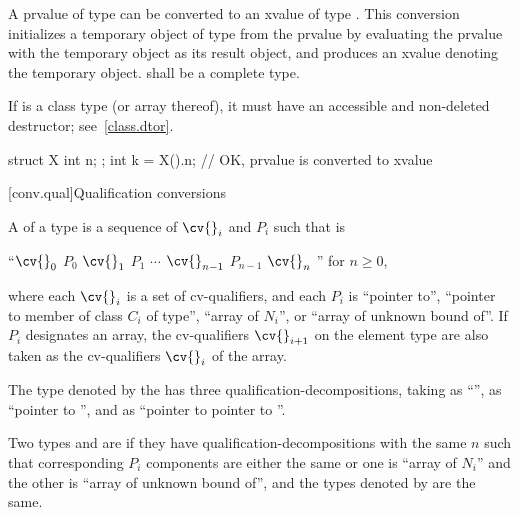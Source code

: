\pnum
A prvalue of type  can be converted to an xvalue of type .
This conversion initializes a temporary object of type  from the prvalue
by evaluating the prvalue with the temporary object as its result object,
and produces an xvalue denoting the temporary object.
 shall be a complete type.
\begin{note}
If  is a class type (or array thereof),
it must have an accessible and non-deleted destructor;
see~\ref{class.dtor}.
\end{note}
\begin{example}
\begin{codeblock}
struct X { int n; };
int k = X().n;      // OK,  prvalue is converted to xvalue
\end{codeblock}
\end{example}

[conv.qual]{Qualification conversions}

%
\pnum
A  of a type 
is a sequence of
$\cv{}_i$ and $P_i$
such that  is
\begin{indented}
``$\cv{}_0$ $P_0$ $\cv{}_1$ $P_1$ $\cdots$ $\cv{}_{n-1}$ $P_{n-1}$ $\cv{}_n$ '' for $n \geq 0$,
\end{indented}
where
each $\cv{}_i$ is a set of cv-qualifiers, and
each $P_i$ is
``pointer to'',
``pointer to member of class $C_i$ of type'',
``array of $N_i$'', or
``array of unknown bound of''.
If $P_i$ designates an array,
the cv-qualifiers $\cv{}_{i+1}$ on the element type are also taken as
the cv-qualifiers $\cv{}_i$ of the array.
\begin{example}
The type denoted by the  
has three qualification-decompositions,
taking 
as ``'',
as ``pointer to '', and
as ``pointer to pointer to ''.
\end{example}

\pnum
{}%
Two types  and  are  if
they have qualification-decompositions with the same $n$
such that corresponding $P_i$ components are either the same
or one is ``array of $N_i$'' and the other is ``array of unknown bound of'',
and the types denoted by  are the same.

